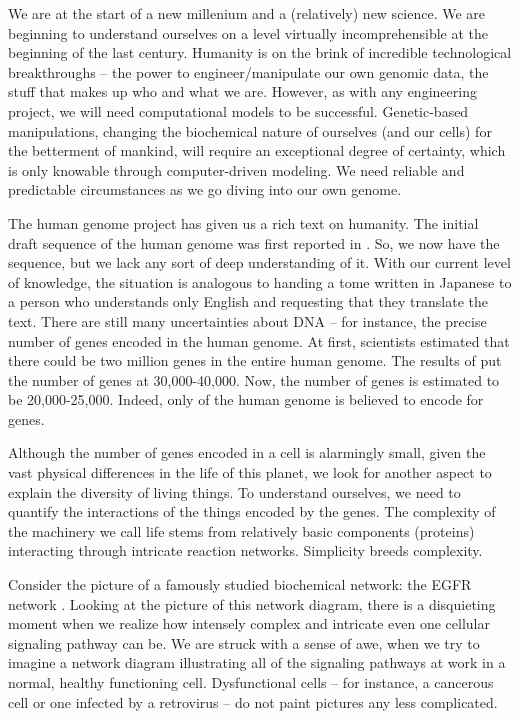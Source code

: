 \documentclass[copyright]{eptcs}
\begin{document}
We are at the start of a new millenium and a (relatively) new science.  We are beginning to understand ourselves on a level virtually incomprehensible at the beginning of the last century.  Humanity is on the brink of incredible technological breakthroughs -- the power to engineer/manipulate our own genomic data, the stuff that makes up who and what we are.  However, as with any engineering project, we will need computational models to be successful.  Genetic-based manipulations, changing the biochemical nature of ourselves (and our cells) for the betterment of mankind, will require an exceptional degree of certainty, which is only knowable through computer-driven modeling.  We need reliable and predictable circumstances as we go diving into our own genome.

The human genome project has given us a rich text on humanity.  The initial draft sequence of the human genome was first reported in \cite{hgp}.  So, we now have the sequence, but we lack any sort of deep understanding of it.  With our current level of knowledge, the situation is analogous to handing a tome written in Japanese to a person who understands only English and requesting that they translate the text.  There are still many uncertainties about DNA -- for instance, the precise number of genes encoded in the human genome. At first, scientists estimated that there could be two million genes in the entire human genome.  The results of \cite{hgp} put the number of genes at 30,000-40,000.  Now, the number of genes is estimated to be 20,000-25,000.  Indeed, only  of the human genome is believed to encode for genes.




Although the number of genes encoded in a cell is alarmingly small, given the vast physical differences in the life of this planet, we look for another aspect to explain the diversity of living things.  To understand ourselves, we need to quantify the interactions of the things encoded by the genes.  The complexity of the machinery we call life stems from relatively basic components (proteins) interacting through intricate reaction networks.  Simplicity breeds complexity.

Consider the picture of a famously studied biochemical network: the EGFR network \cite{oda05}.  Looking at the picture of this network diagram, there is a disquieting moment when we realize how intensely complex and intricate even one cellular signaling pathway can be.  We are struck with a sense of awe, when we try to imagine a network diagram illustrating all of the signaling pathways at work in a normal, healthy functioning cell.  Dysfunctional cells -- for instance, a cancerous cell or one infected by a retrovirus -- do not paint pictures any less complicated.
\end{document}
